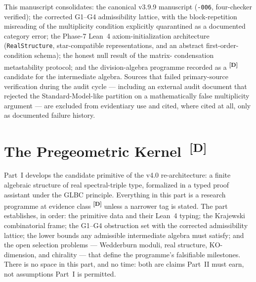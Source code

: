 \documentclass[12pt,a4paper,twoside]{article}
\theoremstyle{plain}
\theoremstyle{definition}
\theoremstyle{remark}
\newcommand{\catmark}[1]{\textsuperscript{\textsf{\textbf{[#1]}}}}
\begin{document}
This manuscript consolidates: the canonical v3.9.9 manuscript
(\texttt{-006}, four-checker verified); the corrected G1--G4
admissibility lattice, with the block-repetition misreading of the
multiplicity condition explicitly quarantined as a documented category
error; the Phase-7 Lean~4 axiom-initialization architecture
(\texttt{RealStructure}, star-compatible representations, and an abstract
first-order-condition schema); the honest null result of the matrix-%
condensation metastability protocol; and the division-algebra programme
recorded as a \catmark{D} candidate for the intermediate algebra. Sources
that failed primary-source verification during the audit cycle ---
including an external audit document that rejected the
Standard-Model-like partition on a mathematically false multiplicity
argument --- are excluded from evidentiary use and cited, where cited at
all, only as documented failure history.

\newpage
\setcounter{secnumdepth}{3}
\part{The Pregeometric Kernel\texorpdfstring{\ \catmark{D}}{[D]}}
\label{part:pregeometric-kernel}

\noindent Part~I develops the candidate primitive of the v4.0
re-architecture: a finite algebraic structure of real spectral-triple type,
formalized in a typed proof assistant under the GLBC principle. Everything
in this part is a research programme at evidence class \catmark{D} unless
a narrower tag is stated. The part establishes, in order: the primitive
data and their Lean~4 typing; the Krajewski combinatorial frame; the
G1--G4 obstruction set with the corrected admissibility lattice; the lower
bounds any admissible intermediate algebra must satisfy; and the open
selection problems --- Wedderburn moduli, real structure, KO-dimension,
and chirality --- that define the programme's falsifiable milestones.
There is no space in this part, and no time: both are claims Part~II must
earn, not assumptions Part~I is permitted.


\end{document}
